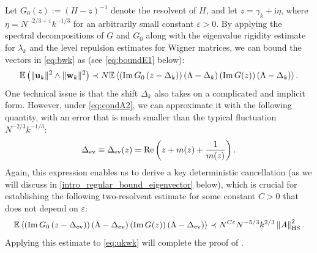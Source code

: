\documentclass[10pt,reqno]{amsart}
\numberwithin{equation}{section}
\numberwithin{figure}{section}
\theoremstyle{plain} %
\theoremstyle{definition} %
\renewcommand{\txt}[1]{\text{\rm{#1}}}
\newcommand{\E}{\mathbb{E}}
\newcommand{\ii}{\mathrm{i}}
\newcommand{\pa}[1]{\left({#1}\right)}
\newcommand{\norm}[1]{\lVert #1 \rVert}
\newcommand{\norma}[1]{\left\lVert #1 \right\rVert}
\newcommand{\avga}[1]{\left\langle #1 \right\rangle}
\DeclareMathOperator{\im}{\mathrm{Im}}
\newcommand{\bu}{{\bf{u}}}
\newcommand{\bw}{{\bf{w}}}
\newcommand{\e}{{\varepsilon}}
\newcommand{\oo}{\mathrm{o}}
\newcommand{\HS}{\txt{HS}}
\numberwithin{equation}{section}
\begin{document}
Let $G_0(z):=(H-z)^{-1}$ denote the resolvent of $H$, and let $z=\gamma_k+\ii\eta$, where $\eta=N^{-2/3+\e}k^{-1/3}$ for an arbitrarily small constant $\e>0$. By applying the spectral decompositions of $G$ and $G_0$ along with the eigenvalue rigidity estimate for $\lambda_k$ and the level repulsion estimates for Wigner matrices, we can bound the vectors in \eqref{eq:bwk} as (see \eqref{eq:boundE1} below):  %
\begin{equation}
\label{eq:ukwk}    \E\pa{\norm{\bu_k}^2\wedge\norm{\bw_k}^2}\prec N\E\avga{\pa{\im G_0\pa{z-\Delta_{k}}}\pa{\Lambda-\Delta_{k}}\pa{\im G (z) }\pa{\Lambda-\Delta_{k}}}.
\end{equation}
One technical issue is that the shift $\Delta_k$ also takes on a complicated and implicit form. 
However, under \eqref{eq:condA2}, we can approximate it with the following quantity, with an error that is much smaller than the typical fluctuation $N^{-2/3}k^{-1/3}$:
\begin{equation}\label{eq:shiftEV}     \Delta_{\txt{ev}}\equiv \Delta_{\txt{ev}}(z)=\mathrm{Re}\pa{z+m (z) +\frac{1}{m (z) }}.
\end{equation}
Again, this expression enables us to derive a key deterministic cancellation (as we will discuss in \eqref{intro_regular_bound_eigenvector} below), which is crucial for establishing the following two-resolvent estimate for some constant $C>0$ that does not depend on $\e$: 
\begin{equation}\label{eq:2-resolven2}
    \begin{aligned}
        \E\avga{\pa{\im G_0\pa{z-\Delta_{\txt{ev}}}}\pa{\Lambda-\Delta_{\txt{ev}}}\pa{\im G (z) }\pa{\Lambda-\Delta_{\txt{ev}}}}\prec N^{C\varepsilon}N^{-5/3}k^{2/3}\norma{A}_{\HS}^2.
    \end{aligned}
\end{equation}
Applying this estimate to \eqref{eq:ukwk} will complete the proof of .
\end{document}
